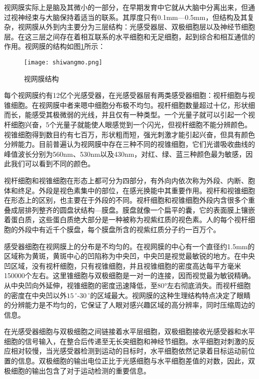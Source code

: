 \documentclass[a4paper,12pt]{article}
\begin{document}
视网膜实际上是脑及其微小的一部分\cite{15:book}，在早期发育中它就从大脑中分离出来，但通过视神经束与大脑保持着适当的联系。其厚度只有0.1mm—0.5mm，但结构及其复杂，视网膜从外到内主要分为三层结构：光感受器层、双极细胞层以及神经节细胞层。在这三层之间存在着相互联系的水平细胞和无足细胞，起到综合和相互通信的作用。视网膜的结构如图\ref{fig 5}所示：

\begin{figure}[htb]
\centering
\texttt{[image: shiwangmo.png]}
\caption{视网膜结构}\label{fig 5} 
\end{figure}


每个视网膜约有12亿个光感受器\cite{15:book}，在光感受器层有两类感受器细胞：视杆细胞与视锥细胞。在视网膜中者来嗯中细胞分布极不均匀。视杆细胞数量超过十亿，形状细而长，能感受其极微弱的光线，并且仅有一种类型。一个光量子就可以引起一个视杆细胞兴奋，5个光量子就能使人眼感觉到一个闪光，但视杆细胞不能分辨颜色。视锥细胞得到数目约有七百万，形状粗而短，强光刺激才能引起兴奋，但具有颜色分辨能力。目前普遍认为视网膜中存在三种不同的视锥细胞\cite{17:book}，它们光谱吸收曲线的峰值波长分别为560nm、530nm以及430nm，对红、绿、蓝三种颜色最为敏感，因此我们可以看到不同的颜色。


视杆细胞和视锥细胞在形态上\cite{11:misc}都可分为四部分，有外向内依次称为外段、内断、胞体和终足。外段是视色素集中的部位，在感光换能中其重要作用。视杆和视锥细胞在形态上的区别，也主要在于外段的不同。视杆细胞和视锥细胞外段内含很多个重叠成层排列整齐的圆盘状结构—膜盘。膜盘就像一个扁平的囊，它的表面膜上镶嵌着蛋白质，这些蛋白质绝大部分是一种被称为视紫红质的视色素。人的每个视杆细胞的外段中有近千个膜盘，每个膜盘所含的视紫红质分子约一百万个。


感受器细胞在视网膜上的分布是不均匀的\cite{15:book}。在视网膜的中心有一个直径约1.5mm的区域称为黄斑\cite{11:misc}，黄斑中心的凹陷称为中央凹，中央凹是视觉最敏锐的地方。在中央凹区域，没有视杆细胞，只有视锥细胞，并且视锥细胞的密度高达每平方毫米150000个左右。这里锥细胞与双极细胞是一对一的连接，因而视觉最为敏锐精确。从中央凹向外延伸，视锥细胞的密度迅速降低，至80°左右彻底消失。而视杆细胞的密度在中央凹以外$15\,^{\circ}$-$30\,^{\circ}$的区域最大。视网膜的这种生理结构特点决定了眼睛的分辨能力是不均匀的，它保证了人眼对感兴趣区域的高分辨率，同时压缩周边的信息。


在光感受器细胞与双极细胞之间链接着水平层细胞，双极细胞接收光感受器和水平细胞的信号输入\cite{5:article}，在整合后传递至无长突细胞和神经节细胞。水平细胞对刺激的反应相对较慢，当光感受器检测到运动的目标时，水平细胞依然记录着目标运动前位置的信息。双极细胞的输出电位正比于光感细胞与水平细胞差值的对数，因此，双极细胞的输出包含了对于运动检测的重要信息。
\end{document}

